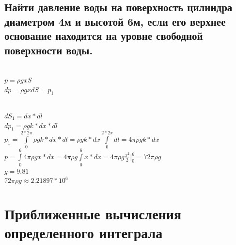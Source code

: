 \documentclass{article}
\begin{document}
\subsection{Найти давление воды на поверхность цилиндра диаметром 4м и высотой 6м, если его верхнее основание находится на уровне свободной поверхности воды.}
\begin{figure}[h!]
\end{figure}
\\
$ p = \rho gxS $\\
$ dp = \rho gxdS = p_1 $\\
\begin{figure}[h!]
\end{figure}\\
$ dS_1 = dx*dl $\\
$ dp_1 = \rho gk*dx*dl $\\
$ p_1 = \int\limits^{2*2\pi}_0 \rho gk*dx*dl = \rho gk*dx \int\limits^{2*2\pi}_0 dl = 4\pi \rho gk*dx $\\
$ p = \int\limits^6_0 4\pi \rho gx*dx = 4\pi \rho g \int\limits^6_0 x*dx = 4\pi \rho g\frac{x^2}{2} |^6_0 = 72\pi \rho g $\\
\small$ g = 9.81 $\\
\normalsize$ 72\pi \rho g \approx 2.21897*10^6$
\newpage
\Large
\section{Приближенные вычисления определенного интеграла}
\normalsize
\end{document}
